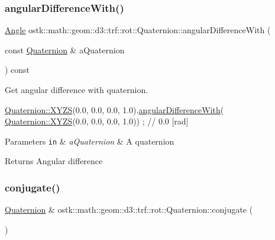 \subsubsection{\texorpdfstring{angular\+Difference\+With()}{angularDifferenceWith()}}
{\footnotesize\ttfamily \hyperlink{classostk_1_1math_1_1geom_1_1_angle}{Angle} ostk\+::math\+::geom\+::d3\+::trf\+::rot\+::\+Quaternion\+::angular\+Difference\+With (\begin{DoxyParamCaption}\item[{const \hyperlink{classostk_1_1math_1_1geom_1_1d3_1_1trf_1_1rot_1_1_quaternion}{Quaternion} \&}]{a\+Quaternion }\end{DoxyParamCaption}) const}



Get angular difference with quaternion. 


\begin{DoxyCode}
\hyperlink{classostk_1_1math_1_1geom_1_1d3_1_1trf_1_1rot_1_1_quaternion_ac57ea57a4033622ed1389101b2e58c76}{Quaternion::XYZS}(0.0, 0.0, 0.0, 1.0).\hyperlink{classostk_1_1math_1_1geom_1_1d3_1_1trf_1_1rot_1_1_quaternion_a9bd5620623586c102dfb92081e6651b5}{angularDifferenceWith}(
      \hyperlink{classostk_1_1math_1_1geom_1_1d3_1_1trf_1_1rot_1_1_quaternion_ac57ea57a4033622ed1389101b2e58c76}{Quaternion::XYZS}(0.0, 0.0, 0.0, 1.0)) ; \textcolor{comment}{// 0.0 [rad]}
\end{DoxyCode}



\begin{DoxyParams}[1]{Parameters}
\mbox{\tt in}  & {\em a\+Quaternion} & A quaternion \\
\hline
\end{DoxyParams}
\begin{DoxyReturn}{Returns}
Angular difference 
\end{DoxyReturn}
\mbox{\label{classostk_1_1math_1_1geom_1_1d3_1_1trf_1_1rot_1_1_quaternion_a7d975785f2a7f4cc83d9410e37908b11}} 
\subsubsection{\texorpdfstring{conjugate()}{conjugate()}}
{\footnotesize\ttfamily \hyperlink{classostk_1_1math_1_1geom_1_1d3_1_1trf_1_1rot_1_1_quaternion}{Quaternion} \& ostk\+::math\+::geom\+::d3\+::trf\+::rot\+::\+Quaternion\+::conjugate (\begin{DoxyParamCaption}{ }\end{DoxyParamCaption})}



